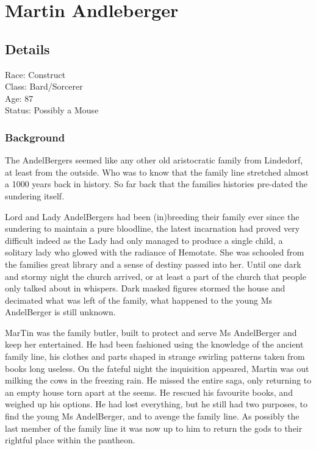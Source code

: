 \section{Martin Andleberger}

\vspace{5mm}

\subsection*{Details}

\noindent

Race: Construct \\
Class: Bard/Sorcerer \\
Age: 87 \\
Status: Possibly a Mouse

\subsubsection{Background}

The AndelBergers seemed like any other old aristocratic family from Lindedorf, at least from the outside. Who was to know that the family line stretched almost a 1000 years back in history. So far back that the families histories pre-dated the sundering itself.    

Lord and Lady AndelBergers had been (in)breeding their family ever since the sundering to maintain a pure bloodline, the latest incarnation had proved very difficult indeed as the Lady had only managed to produce a single child, a solitary lady who glowed with the radiance of Hemotate. She was schooled from the families great library and a sense of destiny passed into her. Until one dark and stormy night the church arrived, or at least a part of the church that people only talked about in whispers. Dark masked figures stormed the house and decimated what was left of the family, what happened to the young Ms AndelBerger is still unknown.   

MarTin was the family butler, built to protect and serve Ms AndelBerger and keep her entertained. He had been fashioned using the knowledge of the ancient family line, his clothes and parts shaped in strange swirling patterns taken from books long useless. On the fateful night the inquisition appeared, Martin was out milking the cows in the freezing rain. He missed the entire saga, only returning to an empty house torn apart at the seems. He rescued his favourite books, and weighed up his options. He had lost everything, but he still had two purposes, to find the young Ms AndelBerger, and to avenge the family line. As possibly the last member of the family line it was now up to him to return the gods to their rightful place within the pantheon.    \medskip

